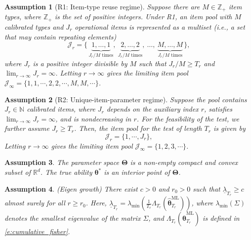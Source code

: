 \documentclass[10pt,a4paper]{amsart}
\newtheorem{assumption}{Assumption}
\newcommand{\bftheta}{\boldsymbol{\theta}}
\begin{document}
\begin{assumption}[R1: Item-type reuse regime] \label{ass:r1}
Suppose there are $M \in \mathbb{Z}_+$ item types, where $\mathbb{Z}_+$ is the set of positive integers.  
Under R1, an item pool with $M$ calibrated types and $J_r$ operational items is represented as a multiset (i.e., a set that may contain repeating elements)
\begin{equation} \label{e:r1}
\mathcal{J}_{r} 
= \{\,\underbrace{1,\ldots,1}_{J_r/M\text{ times}},\
     \underbrace{2,\ldots,2}_{J_r/M\text{ times}},\ \ldots,\
     \underbrace{M,\ldots,M}_{J_r/M\text{ times}}\,\}, 
\end{equation}
where $J_r$ is a positive integer divisible by $M$ such that $J_r/M\geq T_r$ and $\lim_{r\to\infty}J_r=\infty$.
Letting $r \to \infty$ gives the limiting item pool $\mathcal{J}_{\infty} = \{1, 1, \cdots, 2, 2, \cdots, M, M, \cdots\}$. 
\end{assumption}

\begin{assumption}[R2: Unique-item-parameter regime]
\label{ass:r2}
Suppose the pool contains $J_r \in \mathbb{N}$ calibrated items, where $J_r$ depends on the auxiliary index $r$, satisfies $\lim_{r \to \infty} J_r = \infty$, and is nondecreasing in $r$. For the feasibility of the test, we further assume $J_r \geq T_r$. Then, the item pool for the test of length $T_r$ is given by
\begin{equation} \label{e:r2}
\mathcal{J}_{r} = \{1, \cdots, J_r\},
\end{equation}
Letting $r \to \infty$ gives the limiting item pool $\mathcal{J}_{\infty} = \{1,2,3, \cdots \}$.
\end{assumption}

\begin{assumption} \label{ass:compact} 
The parameter space $\boldsymbol{\Theta}$ is a non-empty compact and convex subset of $\mathbb{R}^d$. The true ability $\bftheta^{\ast}$ is an interior point of $\boldsymbol{\Theta}$.
\end{assumption}

\begin{assumption} \label{ass:information1} (Eigen growth) There exist $c>0$ and $r_0 > 0$ such that $\underline\lambda_{T_r} \geq c$ almost surely for all $r \ge r_0$. Here, $\underline\lambda_{T_r} = \lambda_{\min}(\frac{1}{T_r} \Lambda_{T_r}( \hat{\bftheta}_{T_{r}}^{\mathrm{ML}} ))$, where $\lambda_{\min}(\Sigma)$ denotes the smallest eigenvalue of the matrix $\Sigma$, and $\Lambda_{T_r}(  \hat{\bftheta}_{T_r}^{\mathrm{ML}}  )$ is defined in \eqref{e:cumulative_fisher}. 
\end{assumption}
\end{document}
